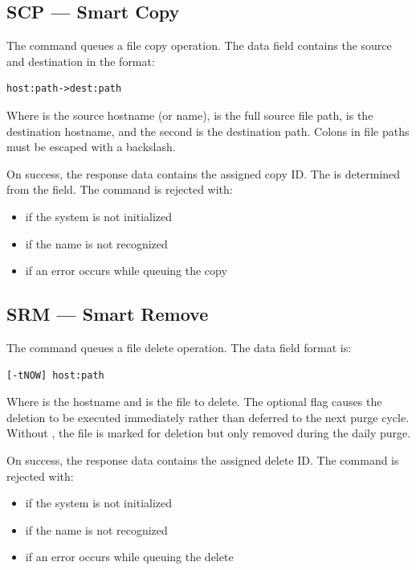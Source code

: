 \subsection{SCP --- Smart Copy}

The  command queues a file copy operation. The data field contains the source and destination in the format:

\begin{lstlisting}
host:path->dest:path
\end{lstlisting}

Where  is the source hostname (or \DR{} name),  is the full source file path,  is the destination hostname, and the second  is the destination path. Colons in file paths must be escaped with a backslash.

On success, the response data contains the assigned copy ID. The \DR{} is determined from the  field. The command is rejected with:
\begin{itemize}
    \item {} if the system is not initialized
    \item {} if the \DR{} name is not recognized
    \item {} if an error occurs while queuing the copy
\end{itemize}

\subsection{SRM --- Smart Remove}

The  command queues a file delete operation. The data field format is:

\begin{lstlisting}
[-tNOW] host:path
\end{lstlisting}

Where  is the hostname and  is the file to delete. The optional  flag causes the deletion to be executed immediately rather than deferred to the next purge cycle. Without , the file is marked for deletion but only removed during the daily purge.

On success, the response data contains the assigned delete ID. The command is rejected with:
\begin{itemize}
    \item {} if the system is not initialized
    \item {} if the \DR{} name is not recognized
    \item {} if an error occurs while queuing the delete
\end{itemize}

